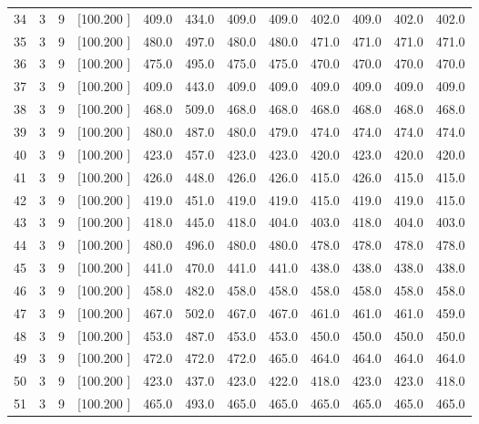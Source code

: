 \documentclass[12pt,a4paper]{article}
\begin{document}
\begin{center}
{\begin{tabular}{r r r r r r r r r r r r}
  34&  3&  9&[100.200   ]&   409.0&   434.0&   409.0&   409.0&   402.0&   409.0&   402.0&   402.0\\[-0.02in]
  35&  3&  9&[100.200   ]&   480.0&   497.0&   480.0&   480.0&   471.0&   471.0&   471.0&   471.0\\[-0.02in]
  36&  3&  9&[100.200   ]&   475.0&   495.0&   475.0&   475.0&   470.0&   470.0&   470.0&   470.0\\[-0.02in]
  37&  3&  9&[100.200   ]&   409.0&   443.0&   409.0&   409.0&   409.0&   409.0&   409.0&   409.0\\[-0.02in]
  38&  3&  9&[100.200   ]&   468.0&   509.0&   468.0&   468.0&   468.0&   468.0&   468.0&   468.0\\[-0.02in]
  39&  3&  9&[100.200   ]&   480.0&   487.0&   480.0&   479.0&   474.0&   474.0&   474.0&   474.0\\[-0.02in]
  40&  3&  9&[100.200   ]&   423.0&   457.0&   423.0&   423.0&   420.0&   423.0&   420.0&   420.0\\[-0.02in]
  41&  3&  9&[100.200   ]&   426.0&   448.0&   426.0&   426.0&   415.0&   426.0&   415.0&   415.0\\[-0.02in]
  42&  3&  9&[100.200   ]&   419.0&   451.0&   419.0&   419.0&   415.0&   419.0&   419.0&   415.0\\[-0.02in]
  43&  3&  9&[100.200   ]&   418.0&   445.0&   418.0&   404.0&   403.0&   418.0&   404.0&   403.0\\[-0.02in]
  44&  3&  9&[100.200   ]&   480.0&   496.0&   480.0&   480.0&   478.0&   478.0&   478.0&   478.0\\[-0.02in]
  45&  3&  9&[100.200   ]&   441.0&   470.0&   441.0&   441.0&   438.0&   438.0&   438.0&   438.0\\[-0.02in]
  46&  3&  9&[100.200   ]&   458.0&   482.0&   458.0&   458.0&   458.0&   458.0&   458.0&   458.0\\[-0.02in]
  47&  3&  9&[100.200   ]&   467.0&   502.0&   467.0&   467.0&   461.0&   461.0&   461.0&   459.0\\[-0.02in]
  48&  3&  9&[100.200   ]&   453.0&   487.0&   453.0&   453.0&   450.0&   450.0&   450.0&   450.0\\[-0.02in]
  49&  3&  9&[100.200   ]&   472.0&   472.0&   472.0&   465.0&   464.0&   464.0&   464.0&   464.0\\[-0.02in]
  50&  3&  9&[100.200   ]&   423.0&   437.0&   423.0&   422.0&   418.0&   423.0&   423.0&   418.0\\[-0.02in]
  51&  3&  9&[100.200   ]&   465.0&   493.0&   465.0&   465.0&   465.0&   465.0&   465.0&   465.0\\[-0.02in]

\end{tabular}}
\end{center}
\end{document}
